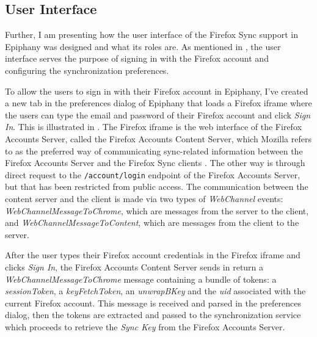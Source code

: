 \subsection{User Interface}
\label{sub-sec:user-interface}

Further, I am presenting how the user interface of the Firefox Sync support in Epiphany was designed and what its roles are. As mentioned in , the user interface serves the purpose of signing in with the Firefox account and configuring the synchronization preferences.


To allow the users to sign in with their Firefox account in Epiphany, I've created a new tab in the preferences dialog of Epiphany that loads a Firefox iframe where the users can type the email and password of their Firefox account and click \textit{Sign In}. This is illustrated in . The Firefox iframe is the web interface of the Firefox Accounts Server, called the Firefox Accounts Content Server, which Mozilla refers to as the preferred way of communicating sync-related information between the Firefox Accounts Server and the Firefox Sync clients \cite{fxa-content-server-webchannels}. The other way is through direct request to the {\tt /account/login} endpoint of the Firefox Accounts Server, but that has been restricted from public access. The communication between the content server and the client is made via two types of \textit{WebChannel} events: \textit{WebChannelMessageToChrome}, which are messages from the server to the client, and \textit{WebChannelMessageToContent}, which are messages from the client to the server.

After the user types their Firefox account credentials in the Firefox iframe and clicks \textit{Sign In}, the Firefox Accounts Content Server sends in return a \textit{WebChannelMessageToChrome} message containing a bundle of tokens: a \textit{sessionToken}, a \textit{keyFetchToken}, an \textit{unwrapBKey} and the \textit{uid} associated with the current Firefox account. This message is received and parsed in the preferences dialog, then the tokens are extracted and passed to the synchronization service which proceeds to retrieve the \textit{Sync Key} from the Firefox Accounts Server.


